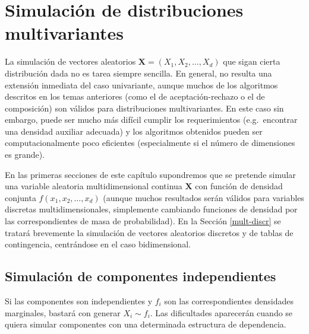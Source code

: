 \documentclass[
  spanish,
  10pt,
]{book}
\renewcommand{\mathbf}[1]{\symbf{#1}}
\theoremstyle{break}
\theoremstyle{nonumberplain}
\begin{document}
\chapter{Simulación de distribuciones multivariantes}\label{multivariante}

La simulación de vectores aleatorios \(\mathbf{X} = \left( X_1, X_2, \ldots, X_d\right)\) que sigan cierta distribución dada no es tarea siempre sencilla.
En general, no resulta una extensión inmediata del caso univariante, aunque muchos de los algoritmos descritos en los temas anteriores (como el de aceptación-rechazo o el de composición) son válidos para distribuciones multivariantes.
En este caso sin embargo, puede ser mucho más difícil cumplir los requerimientos (e.g.~encontrar una densidad auxiliar adecuada) y los algoritmos obtenidos pueden ser computacionalmente poco eficientes (especialmente si el número de dimensiones es grande).

En las primeras secciones de este capítulo supondremos que se pretende simular una variable aleatoria multidimensional continua \(\mathbf{X}\) con función de densidad conjunta \(f\left( x_1, x_2, \ldots , x_d\right)\) (aunque muchos resultados serán válidos para variables discretas multidimensionales, simplemente cambiando funciones de densidad por las correspondientes de masa de probabilidad).
En la Sección \ref{mult-discr} se tratará brevemente la simulación de vectores aleatorios discretos y de tablas de contingencia, centrándose en el caso bidimensional.

\section{Simulación de componentes independientes}\label{simulaciuxf3n-de-componentes-independientes}

Si las componentes son independientes y \(f_i\) son las correspondientes densidades marginales, bastará con generar \(X_i \sim f_i\).
Las dificultades aparecerán cuando se quiera simular componentes con una determinada estructura de dependencia.
\end{document}
